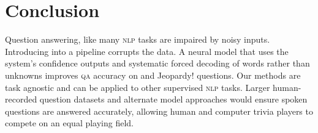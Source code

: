 
\section{Conclusion}
\label{sec:conclusion}

Question answering, like many \textsc{nlp} tasks are impaired by noisy inputs.
Introducing \asr{} into a  pipeline corrupts
the data.  A neural model that uses the \asr{} system's confidence outputs and systematic forced decoding of words rather than unknowns improves  \textsc{qa} accuracy on \qb{} and Jeopardy! questions.  
Our methods are task agnostic and can be applied to other supervised \textsc{nlp} tasks.
Larger human-recorded question datasets and alternate model approaches
would ensure spoken questions are answered accurately, allowing human
and computer trivia players to compete on an equal playing field.





